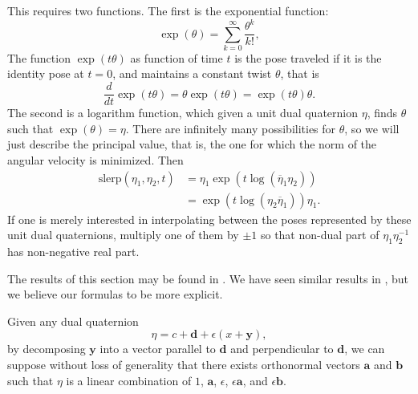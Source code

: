 \documentclass[reqno,12pt]{amsart}
\begin{document}
This requires two functions.  The first is the exponential function:
\begin{equation}
\label{exponential}
\exp(\theta) = \sum_{k=0}^\infty \frac{\theta^k}{k!},
\end{equation}
The function $\exp(t \theta)$ as function of time $t$ is the pose traveled if it is the identity pose at $t = 0$, and maintains a constant twist $\theta$, that is
\begin{equation}
\frac d{dt} \exp(t\theta) = \theta \exp(t\theta) = \exp(t\theta) \theta .
\end{equation}
The second is a logarithm function, which given a unit dual quaternion $\eta$, finds $\theta$ such that $\exp(\theta) = \eta$.  There are infinitely many possibilities for $\theta$, so we will just describe the principal value, that is, the one for which the norm of the angular velocity is minimized.  Then
\begin{equation}
\begin{aligned}
\text{slerp}(\eta_1, \eta_2, t) &= \eta_1 \exp(t \log(\overline\eta_1 \eta_2)) \\
&= \exp(t \log(\eta_2 \overline\eta_1)) \eta_1 .
\end{aligned}
\end{equation}
If one is merely interested in interpolating between the poses represented by these unit dual quaternions, multiply one of them by $\pm 1$ so that non-dual part of $\eta_1 \eta_2^{-1}$ has non-negative real part.

The results of this section may be found in \cite{montgomery-smith}.  We have seen similar results in \cite{wang-et-al}, but we believe our formulas to be more explicit.

Given any dual quaternion
\begin{equation}
\eta = c + \bm d + \epsilon (x + \bm y),
\end{equation}
by decomposing $\bm y$ into a vector parallel to $\bm d$ and perpendicular to $\bm d$, we can suppose without loss of generality that there exists orthonormal vectors $\bm a$ and $\bm b$ such that $\eta$ is a linear combination of $1$, $\bm a$, $\epsilon$, $\epsilon \bm a$, and $\epsilon \bm b$.
\end{document}
